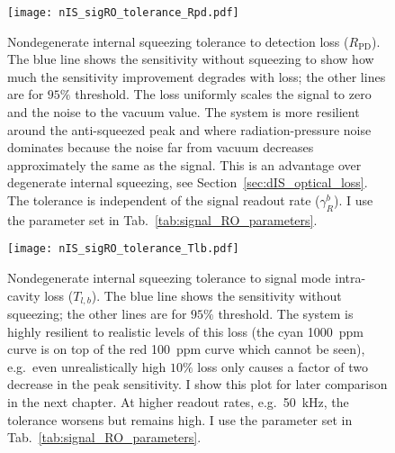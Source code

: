 \begin{figure}
    \centering
    \texttt{[image: nIS\_sigRO\_tolerance\_Rpd.pdf]}
    \caption{ Nondegenerate internal squeezing tolerance to detection loss ($R_\text{PD}$). The blue line shows the sensitivity without squeezing to show how much the sensitivity improvement degrades with loss; the other lines are for $95\%$ threshold. The loss uniformly scales the signal to zero and the noise to the vacuum value. The system is more resilient around the anti-squeezed peak and where radiation-pressure noise dominates because the noise far from vacuum decreases approximately the same as the signal. This is an advantage over degenerate internal squeezing, see Section~\ref{sec:dIS_optical_loss}. The tolerance is independent of the signal readout rate ($\gamma^b_R$). I use the parameter set in Tab.~\ref{tab:signal_RO_parameters}.}
    \label{fig:nIS_sigRO_tolerance_Rpd}
\end{figure}
\begin{figure}[t]
    \centering
    \texttt{[image: nIS\_sigRO\_tolerance\_Tlb.pdf]}
    \caption{ Nondegenerate internal squeezing tolerance to signal mode intra-cavity loss ($T_{l,b}$). The blue line shows the sensitivity without squeezing; the other lines are for $95\%$ threshold.
    The system is highly resilient to realistic levels of this loss (the cyan 1000~ppm curve is on top of the red 100~ppm curve which cannot be seen), e.g.\ even unrealistically high $10\%$ loss only causes a factor of two decrease in the peak sensitivity. I show this plot for later comparison in the next chapter. At higher readout rates, e.g.\ 50~kHz, the tolerance worsens but remains high. I use the parameter set in Tab.~\ref{tab:signal_RO_parameters}.
    }
    \label{fig:nIS_sigRO_tolerance_Tlb}
\end{figure}
